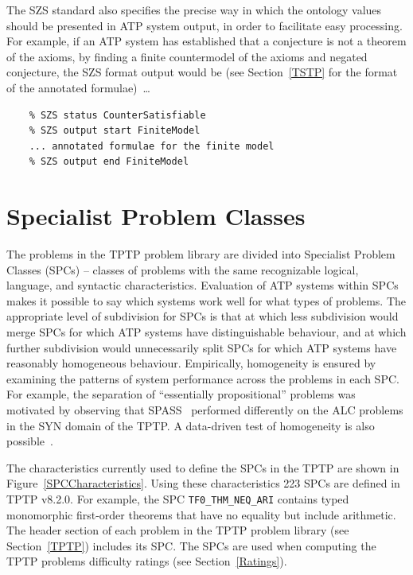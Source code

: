 \documentclass{easychair}
\begin{document}
The SZS standard also specifies the precise way in which the ontology values should be presented
in ATP system output, in order to facilitate easy processing.
For example, if an ATP system has established that a conjecture is not a theorem of the axioms,
by finding a finite countermodel of the axioms and negated conjecture, the SZS format output 
would be (see Section~\ref{TSTP} for the format of the annotated formulae)~\ldots \\
\begin{minipage}{\textwidth}
\begin{verbatim}
    % SZS status CounterSatisfiable
    % SZS output start FiniteModel
    ... annotated formulae for the finite model 
    % SZS output end FiniteModel
\end{verbatim}
\end{minipage}

\vspace*{1em}

\section{Specialist Problem Classes}
\label{SPCs}

The problems in the TPTP problem library are divided into Specialist Problem Classes (SPCs) -- 
classes of problems with the same recognizable logical, language, and syntactic characteristics.
Evaluation of ATP systems within SPCs makes it possible to say which systems work well for what 
types of problems. 
The appropriate level of subdivision for SPCs is that at which less subdivision would merge 
SPCs for which ATP systems have distinguishable behaviour, and at which further subdivision
would unnecessarily split SPCs for which ATP systems have reasonably homogeneous behaviour.
Empirically, homogeneity is ensured by examining the patterns of system performance across the 
problems in each SPC. 
For example, the separation of ``essentially propositional'' problems was motivated by observing 
that SPASS~\cite{WA+99} performed differently on the ALC problems in the SYN domain of the TPTP.
A data-driven test of homogeneity is also possible~\cite{FS02}.

The characteristics currently used to define the SPCs in the TPTP are shown in 
Figure~\ref{SPCCharacteristics}.
Using these characteristics 223 SPCs are defined in TPTP v8.2.0. 
For example, the SPC
{\tt TF0\_THM\_NEQ\_ARI} contains typed monomorphic first-order theorems that have no equality but 
include arithmetic.
The header section of each problem in the TPTP problem library (see Section~\ref{TPTP}) includes 
its SPC.
The SPCs are used when computing the TPTP problems difficulty ratings (see Section~\ref{Ratings}).
\end{document}
